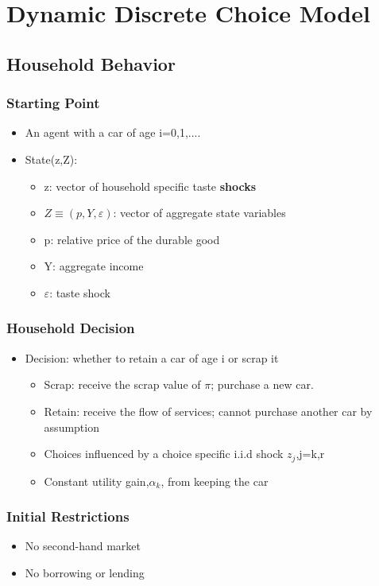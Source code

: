 \documentclass{beamer}
\begin{document}
\section{Dynamic Discrete Choice Model}
\subsection{Household Behavior}
\begin{frame}
\frametitle{Starting Point}
\begin{itemize}
\item An agent with a car of age i=0,1,....
\item State(z,Z):
\begin{itemize}
\item z: vector of household specific taste \textbf{shocks}
\item $Z\equiv(p,Y,\varepsilon)$: vector of aggregate state variables
\item p: relative price of the durable good
\item Y: aggregate income
\item $\varepsilon$: \aggregate taste shock
\end{itemize}
\end{itemize}
\end{frame}

\begin{frame}
\frametitle{Household Decision}
\begin{itemize}
\item Decision: whether to retain a car of age i or scrap it
\begin{itemize}
\item Scrap: receive the scrap value of $\pi$; purchase a new car.
\item Retain: receive the flow of services; cannot purchase another car by assumption
\item Choices influenced by a choice specific i.i.d shock $z_j$,j=k,r
\item Constant utility gain,$\alpha_k$, from keeping the car %
\end{itemize}
\end{itemize}
\end{frame}

\begin{frame}
\frametitle{Initial Restrictions}
\begin{itemize}
\item No second-hand market
\item No borrowing or lending
\end{itemize}
\end{frame}
\end{document}
